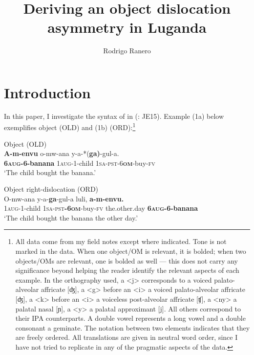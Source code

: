 \documentclass[output=paper
,newtxmath
,modfonts
,nonflat]{langsci/langscibook}
\title{Deriving an object dislocation asymmetry in Luganda}
\author{Rodrigo Ranero
\affiliation{University of Maryland}}
\begin{document}
\maketitle

\section{Introduction}\label{sec:ranero:1}

In this paper, I investigate the syntax of  in  (: JE15). Example (1a) below exemplifies object  (OLD) and (1b)  (ORD):\footnote{All data come from my field notes except where indicated. Tone is not marked in the data. When one object/OM is relevant, it is bolded; when two objects/OMs are relevant, one is bolded as well — this does not carry any significance beyond helping the reader identify the relevant aspects of each example. In the orthography used, a <j> corresponds to a voiced palato-alveolar affricate [ʤ], a <g> before an <i> a voiced palato-alveolar affricate [ʤ], a <k> before an <i> a voiceless post-alveolar affricate [ʧ], a <ny> a palatal nasal [ɲ], a <y> a palatal approximant [j]. All others correspond to their IPA counterparts. A double vowel represents a long vowel and a double consonant a geminate. The notation {\textbar}{\textbar} between two elements indicates that they are freely ordered.  All translations are given in neutral word order, since I have not tried to replicate in  any of the pragmatic aspects of the  data.}

\ea\label{ex:ranero:1} 
\ea\label{ex:ranero:1a} Object  (OLD)\\
\gll \textbf{A-m-envu} o-mw-ana y-a-*(\textbf{ga)}{}-gul-a.\\          
\textbf{6\textsc{aug}}\textbf{{}-6-banana} 1\textsc{aug}{}-1-child 1\textsc{sa}{}-\textsc{pst}{}-6\textbf{\textsc{om}}{}-buy\textsc{{}-fv}\\
\glt ‘The child bought the banana.’   

\ex\label{ex:ranero:1b} Object right-dislocation (ORD)\\
\gll O-mw-ana      y-a-\textbf{ga}{}-gul-a       luli,       \textbf{a-m-envu.}\\
1\textsc{aug}{}-1-child \textsc{1sa-pst}\textbf{{}-6}\textbf{\textsc{om}}{}-buy-\textsc{fv} the.other.day \textbf{6\textsc{aug}}\textbf{{}-6-banana}\\
\glt ‘The child bought the banana the other day.’ 
\z
\z
\end{document}

